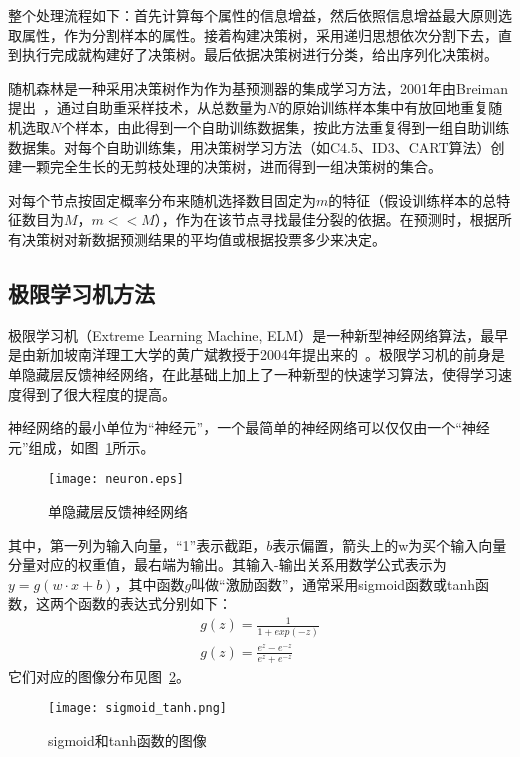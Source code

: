 整个处理流程如下：首先计算每个属性的信息增益，然后依照信息增益最大原则选取属性，作为分割样本的属性。接着构建决策树，采用递归思想依次分割下去，直到执行完成就构建好了决策树。最后依据决策树进行分类，给出序列化决策树。

随机森林是一种采用决策树作为作为基预测器的集成学习方法，2001年由Breiman提出~\cite{breiman2001random}，通过自助重采样技术，从总数量为$N$的原始训练样本集中有放回地重复随机选取$N$个样本，由此得到一个自助训练数据集，按此方法重复得到一组自助训练数据集。对每个自助训练集，用决策树学习方法（如C4.5、ID3、CART算法）创建一颗完全生长的无剪枝处理的决策树，进而得到一组决策树的集合。

对每个节点按固定概率分布来随机选择数目固定为$m$的特征（假设训练样本的总特征数目为$M$，$m << M$），作为在该节点寻找最佳分裂的依据。在预测时，根据所有决策树对新数据预测结果的平均值或根据投票多少来决定。

\subsection{极限学习机方法}

极限学习机（Extreme Learning Machine, ELM）是一种新型神经网络算法，最早是由新加坡南洋理工大学的黄广斌教授于2004年提出来的~\cite{huang2004extreme}。极限学习机的前身是单隐藏层反馈神经网络，在此基础上加上了一种新型的快速学习算法，使得学习速度得到了很大程度的提高。

神经网络的最小单位为“神经元”，一个最简单的神经网络可以仅仅由一个“神经元”组成，如图~\ref{fig: neuron}所示。

\begin{figure}
\centering
\texttt{[image: neuron.eps]}
\caption{单隐藏层反馈神经网络}
\label{fig: neuron}
\end{figure}

其中，第一列为输入向量，“1”表示截距，$b$表示偏置，箭头上的w为买个输入向量分量对应的权重值，最右端为输出。其输入-输出关系用数学公式表示为$y = g(w \cdot x + b)$，其中函数$g$叫做“激励函数”，通常采用sigmoid函数或tanh函数，这两个函数的表达式分别如下：
\begin{align}
g(z) = \frac{1}{1+exp(-z)}\\
g(z) = \frac{e^z - e^{-z}}{e^z + e^{-z}}
\end{align}
它们对应的图像分布见图~\ref{fig: sigmoid_tanh}。

\begin{figure}
\centering
\texttt{[image: sigmoid\_tanh.png]}
\caption{sigmoid和tanh函数的图像}
\label{fig: sigmoid_tanh}
\end{figure}

